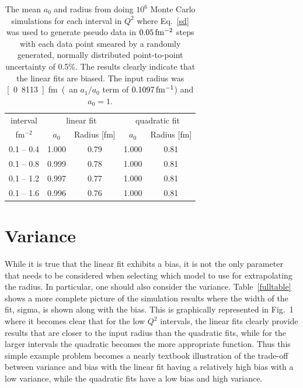 \documentclass[10pt,aps,prc,twocolumn]{revtex4-1}
\begin{document}
\begin{table}
\caption{The mean $a_0$ and radius from doing $10^6$ Monte Carlo simulations
for each interval in $Q^2$
where Eq.~\ref{sd} was used to generate pseudo data in $\unit[0.05]{fm^{-2}}$ steps
with each data point smeared by a randomly generated, normally distributed point-to-point 
uncertainty of 0.5\%.
The results clearly indicate that the linear fits are biased.   The input
radius was \unit[0.8113]{fm} (an $a_1/a_0$ term of $\unit[0.1097]{fm^{-1}}$) and $a_0 = 1$.}
\begin{tabular}{c|cc|cc} \hline
interval       & \multicolumn{2}{c|}{linear fit} & \multicolumn{2}{c}{quadratic fit}  \\
fm$^{-2}$      & $a_0$      & Radius [fm]          & $a_0$    & Radius [fm] \\ \hline
 0.1 -- 0.4 & 1.000& 0.79& 1.000& 0.81 \\
 0.1 -- 0.8 & 0.999& 0.78& 1.000& 0.81 \\
 0.1 -- 1.2 & 0.997& 0.77& 1.000& 0.81 \\
 0.1 -- 1.6 & 0.996& 0.76& 1.000& 0.81 \\ \hline
\end{tabular}
\label{ztable}
\end{table}


\section{Variance}

While it is true that the linear fit exhibits a bias, it is not the only parameter that needs
to be considered when selecting which model to use for extrapolating the radius.
In particular, one should also consider the variance.
Table~\ref{fulltable} shows a more complete picture of the simulation results 
where the width of the fit, sigma, is 
shown along with the bias.   This is graphically represented in Fig.~1 where it becomes clear that 
for the low $Q^2$ intervals, the linear fits clearly provide results that are closer to
the input radius than the quadratic fits, while for the larger intervals the quadratic becomes
the more appropriate function.
Thus this simple example problem becomes a nearly textbook illustration of the trade-off between 
variance and bias with the linear fit having a relatively high bias with a low variance, while the 
quadratic fits have a low bias and high variance.
\end{document}
